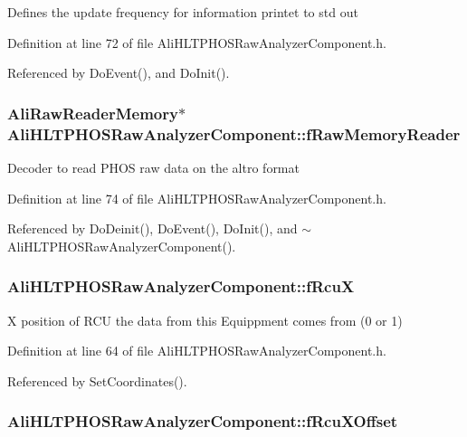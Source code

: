 Defines the update frequency for information printet to std out 

Definition at line 72 of file Ali\-HLTPHOSRaw\-Analyzer\-Component.h.

Referenced by Do\-Event(), and Do\-Init().
\subsubsection{\setlength{\rightskip}{0pt plus 5cm}Ali\-Raw\-Reader\-Memory$\ast$ {\bf Ali\-HLTPHOSRaw\-Analyzer\-Component::f\-Raw\-Memory\-Reader}\hspace{0.3cm}{\tt  [private]}}\label{classAliHLTPHOSRawAnalyzerComponent_r12}


Decoder to read PHOS raw data on the altro format 

Definition at line 74 of file Ali\-HLTPHOSRaw\-Analyzer\-Component.h.

Referenced by Do\-Deinit(), Do\-Event(), Do\-Init(), and $\sim$Ali\-HLTPHOSRaw\-Analyzer\-Component().
\subsubsection{ {\bf Ali\-HLTPHOSRaw\-Analyzer\-Component::f\-Rcu\-X}\hspace{0.3cm}{\tt  [private]}}\label{classAliHLTPHOSRawAnalyzerComponent_r2}


X position of RCU the data from this Equippment comes from (0 or 1) 

Definition at line 64 of file Ali\-HLTPHOSRaw\-Analyzer\-Component.h.

Referenced by Set\-Coordinates().
\subsubsection{ {\bf Ali\-HLTPHOSRaw\-Analyzer\-Component::f\-Rcu\-XOffset}\hspace{0.3cm}{\tt  [private]}}\label{classAliHLTPHOSRawAnalyzerComponent_r5}



